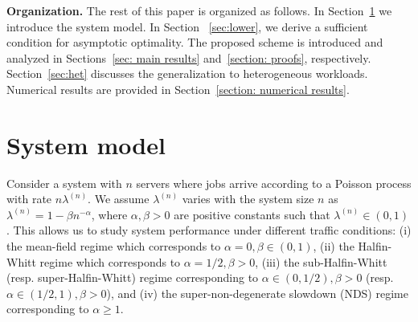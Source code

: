 \documentclass[a4paper]{article}
\theoremstyle{plain}
\theoremstyle{definition}
\theoremstyle{case}
\theoremstyle{remark}
\begin{document}


\textbf{Organization.} The rest of this paper is organized as follows. In Section~\ref{section: system model} we introduce the system model. In Section ~\ref{sec:lower}, we derive a sufficient condition for asymptotic optimality. The proposed scheme is introduced and analyzed in Sections~\ref{sec: main results} and~\ref{section: proofs}, respectively. Section~\ref{sec:het} discusses the generalization to heterogeneous workloads. Numerical results are provided in Section~\ref{section: numerical results}.

\section{System model} 
\label{section: system model}

Consider a system with $n$ servers where jobs arrive according to a Poisson process with rate $n\lambda^{(n)}$. We assume $\lambda^{(n)}$ varies with the system size $n$ as $\lambda^{(n)}=1-\beta n^{-\alpha}$, where $\alpha,\beta >0$ are positive constants such that $\lambda^{(n)} \in (0,1)$. This allows us to study system performance under different traffic conditions: (i) the mean-field regime which corresponds to
$\alpha = 0, \beta \in (0, 1)$, (ii) the Halfin-Whitt regime which corresponds to $\alpha = 1/2, \beta >0$, (iii) the sub-Halfin-Whitt (resp. super-Halfin-Whitt) regime corresponding to
$\alpha \in (0, 1/2), \beta>0$ (resp. $\alpha \in (1/2, 1), \beta>0$), and (iv) the super-non-degenerate slowdown (NDS) regime corresponding to $\alpha \geq 1$. 
\end{document}
